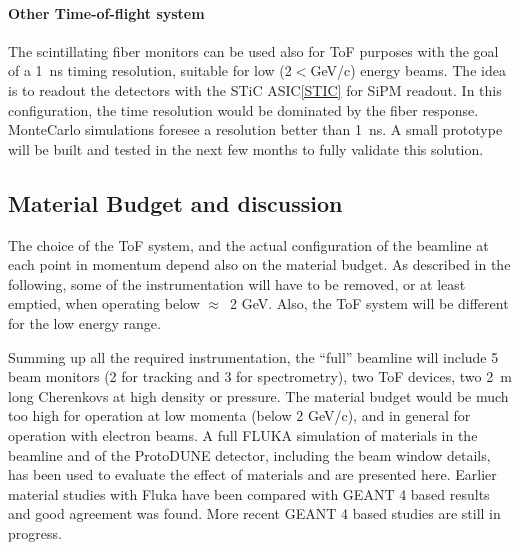 \paragraph{Other Time-of-flight system}
The  scintillating fiber monitors can be used also for ToF purposes with the goal of a 1~ns timing resolution, suitable for low (2$<$GeV/c) energy beams. The idea is to readout the detectors with the STiC ASIC\ref{STIC} for SiPM readout.
In this configuration, the time resolution would be dominated by the fiber response. MonteCarlo simulations foresee a resolution better than 1~ns. 
A small prototype will be built and tested in the next few months to fully validate this solution.


\subsection{Material Budget and discussion}
\label{beam-material-budget}
The choice of the ToF system, and the actual configuration of the beamline at each point in momentum depend also on the material budget. As described in the following, some of the instrumentation will have to be removed, or at least emptied, when operating below $\approx$~2 GeV. Also, the ToF system will be different for the low energy range.

Summing up all the required instrumentation, the ``full'' beamline will  include
 5 beam monitors (2 for tracking and 3 for spectrometry), two ToF devices, two 2~m long Cherenkovs at high density or pressure. The material budget would be much too high for operation at low momenta (below 2 GeV/c), 
 and in general for operation with electron beams.  
A full FLUKA\cite{fluka05,Fluka15}  simulation of materials in the beamline and of the ProtoDUNE detector, including the beam window details, has been used to evaluate the effect of materials and are presented here. 
Earlier material studies with Fluka have been compared with GEANT 4 based results and good agreement was found. More recent GEANT 4 based studies are still in progress.

